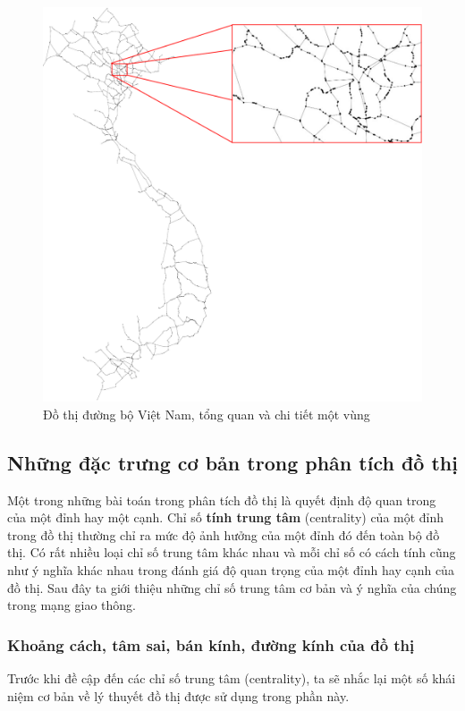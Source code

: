 \documentclass[14pt, oneside, a4paper, openany]{scrartcl}
\begin{document}
\begin{figure}[!h]
	\centering
	\includegraphics[scale=0.45]{figures/vnroadgraphtotaledit.pdf} 
	\caption[Đồ thị đường bộ Việt Nam]{Đồ thị đường bộ Việt Nam, tổng quan và chi tiết một vùng}
	\label{fig:vnhighwaynet}
\end{figure}

\subsection{Những đặc trưng cơ bản trong phân tích đồ thị}
Một trong những bài toán trong phân tích đồ thị là quyết định độ quan trong của một đỉnh hay một cạnh. Chỉ số \textbf{tính trung tâm}  (centrality) của một đỉnh trong đồ thị thường chỉ ra mức độ ảnh hưởng của một đỉnh đó đến toàn bộ đồ thị. Có rất nhiều loại chỉ số trung tâm khác nhau và mỗi chỉ số có cách tính cũng như ý nghĩa khác nhau trong đánh giá độ quan trọng của một đỉnh hay cạnh của đồ thị. Sau đây ta giới thiệu những chỉ số trung tâm cơ bản và ý nghĩa của chúng trong mạng giao thông.

\subsubsection{Khoảng cách, tâm sai, bán kính, đường kính của đồ thị}
Trước khi đề cập đến các chỉ số trung tâm (centrality), ta sẽ nhắc lại một số khái niệm cơ bản về lý thuyết đồ thị được sử dụng trong phần này.
\end{document}
